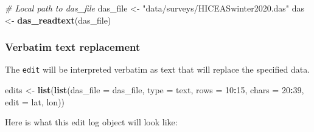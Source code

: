\documentclass[
]{book}
\newenvironment{Shaded}{\begin{snugshade}}{\end{snugshade}}
\newcommand{\AttributeTok}[1]{\textcolor[rgb]{0.13,0.29,0.53}{#1}}
\newcommand{\CommentTok}[1]{\textcolor[rgb]{0.56,0.35,0.01}{\textit{#1}}}
\newcommand{\DecValTok}[1]{\textcolor[rgb]{0.00,0.00,0.81}{#1}}
\newcommand{\FunctionTok}[1]{\textcolor[rgb]{0.13,0.29,0.53}{\textbf{#1}}}
\newcommand{\NormalTok}[1]{#1}
\newcommand{\OtherTok}[1]{\textcolor[rgb]{0.56,0.35,0.01}{#1}}
\newcommand{\SpecialCharTok}[1]{\textcolor[rgb]{0.81,0.36,0.00}{\textbf{#1}}}
\newcommand{\StringTok}[1]{\textcolor[rgb]{0.31,0.60,0.02}{#1}}
\begin{document}
\begin{Shaded}
\begin{Highlighting}[]
\CommentTok{\# Local path to das\_file}
\NormalTok{das\_file }\OtherTok{\textless{}{-}} \StringTok{"data/surveys/HICEASwinter2020.das"}
\NormalTok{das }\OtherTok{\textless{}{-}} \FunctionTok{das\_readtext}\NormalTok{(das\_file)}
\end{Highlighting}
\end{Shaded}

\hypertarget{verbatim-text-replacement}{%
\subsubsection*{Verbatim text replacement}\label{verbatim-text-replacement}}

The \texttt{edit} will be interpreted verbatim as text that will replace the specified data.

\begin{Shaded}
\begin{Highlighting}[]
\NormalTok{edits }\OtherTok{\textless{}{-}} \FunctionTok{list}\NormalTok{(}\FunctionTok{list}\NormalTok{(}\AttributeTok{das\_file =}\NormalTok{ das\_file, }
                   \AttributeTok{type =} \StringTok{\textquotesingle{}text\textquotesingle{}}\NormalTok{,}
                   \AttributeTok{rows =} \DecValTok{10}\SpecialCharTok{:}\DecValTok{15}\NormalTok{, }
                   \AttributeTok{chars =} \DecValTok{20}\SpecialCharTok{:}\DecValTok{39}\NormalTok{, }
                   \AttributeTok{edit =} \StringTok{\textquotesingle{}lat, lon\textquotesingle{}}\NormalTok{))}
\end{Highlighting}
\end{Shaded}

Here is what this edit log object will look like:
\end{document}
